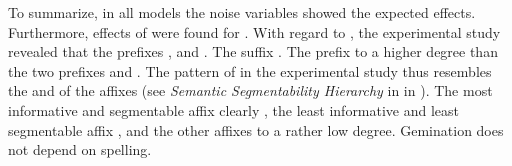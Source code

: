 To summarize, in all models the noise variables showed the expected effects. Furthermore, effects of  were found for . 
With regard to , the experimental study revealed that the prefixes ,  and  . The suffix  . 
The prefix   to a higher degree than the two prefixes and . The pattern of  in the experimental study thus resembles the  and  of the affixes (see \textit{Semantic Segmentability Hierarchy} in  in ). The most informative and segmentable affix  clearly , the least informative and least segmentable affix  , and the other affixes  to a rather low degree. Gemination does not depend on spelling. 


